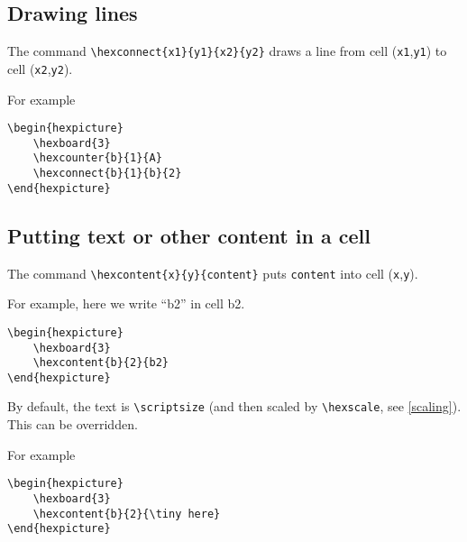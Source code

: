 \documentclass[a4paper,12pt]{article}
\begin{document}
    \begin{hexpicture}
    \end{hexpicture}
    
    \subsection{Drawing lines}
    
    The command \verb|\hexconnect{x1}{y1}{x2}{y2}| draws a line from cell (\verb|x1|,\verb|y1|) to cell (\verb|x2|,\verb|y2|).
    
    For example
    
    \begin{verbatim}\begin{hexpicture}
    \hexboard{3}
    \hexcounter{b}{1}{A}
    \hexconnect{b}{1}{b}{2}
\end{hexpicture}\end{verbatim}
    
    \begin{hexpicture}
    \end{hexpicture}

    \subsection{Putting text or other content in a cell}
    
    The command \verb|\hexcontent{x}{y}{content}| puts \verb|content| into cell (\verb|x|,\verb|y|). 
    
    For example, here we write ``b2'' in cell b2.
    
    \begin{verbatim}\begin{hexpicture}
    \hexboard{3}
    \hexcontent{b}{2}{b2}
\end{hexpicture}\end{verbatim}
    
    \begin{hexpicture}
    \end{hexpicture}

    By default, the text is \verb|\scriptsize| (and then scaled by \verb|\hexscale|, see \ref{scaling}). This can be overridden. 
    
    For example
    
    \begin{verbatim}\begin{hexpicture}
    \hexboard{3}
    \hexcontent{b}{2}{\tiny here}
\end{hexpicture}\end{verbatim}
    
\end{document}
